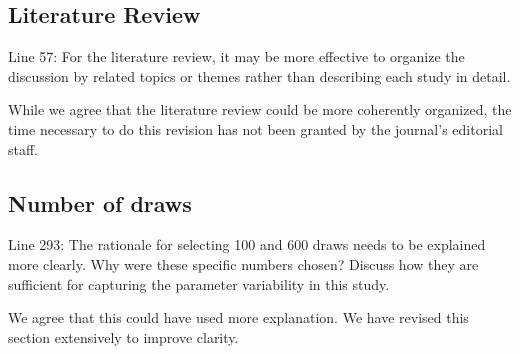 \documentclass{ar2rc}
\begin{document}
\subsection{Literature Review}
\RC Line 57: For the literature review, it may be more effective to organize the discussion by related
topics or themes rather than describing each study in detail.

\AR While we agree that the literature review could be more coherently organized, the time necessary
to do this revision has not been granted by the journal's editorial staff.

\subsection{Number of draws}
\RC Line 293: The rationale for selecting 100 and 600 draws needs to be explained more clearly.
Why were these specific numbers chosen? Discuss how they are sufficient for capturing the
parameter variability in this study.

\AR We agree that this could have used more explanation. We have revised this
section extensively to improve clarity.
\end{document}
